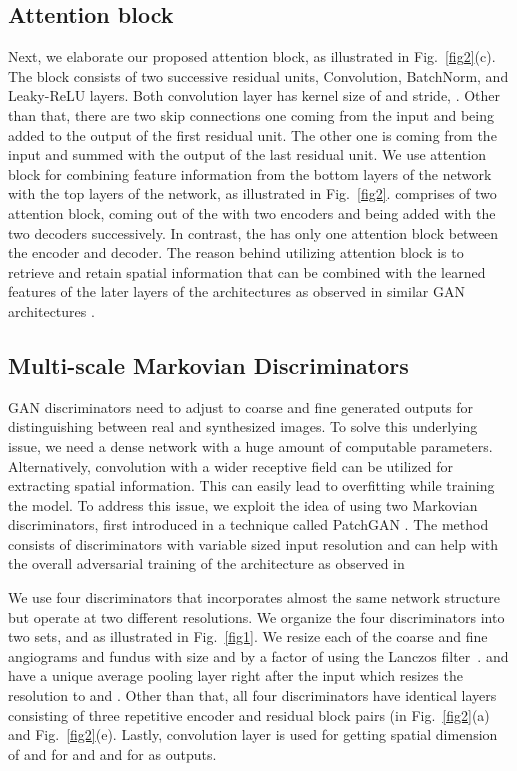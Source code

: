 \documentclass[a4paper,conference]{IEEEtran}
\begin{document}
\subsection{Attention block}
\label{subsec:attention}
Next, we elaborate our proposed attention block, as illustrated in
Fig.~\ref{fig2}(c). The block consists of two successive residual units, Convolution, BatchNorm, and Leaky-ReLU layers. Both convolution layer has kernel size of  and stride, . Other than that, there are two skip connections one coming from the input and being added to the output of the first residual unit. The other one is coming from the input and summed with the output of the last residual unit. We use attention block for combining feature information from the bottom layers of the network with the top layers of the network, as illustrated in Fig.~\ref{fig2}.  comprises of two attention block, coming out of the with two encoders and being added with the two decoders successively. In contrast, the  has only one attention block between the encoder and decoder.  The reason behind utilizing attention block is to retrieve and retain spatial information that can be combined with the learned features of the later layers of the architectures as observed in similar GAN architectures \cite{zhang2019self,chen2018attention}. 


\subsection{Multi-scale Markovian Discriminators}
\label{subsec:discriminators}
GAN discriminators need to adjust to coarse and fine generated outputs for distinguishing between real and synthesized images. To solve this underlying issue, we need a dense network with a huge amount of computable parameters. Alternatively, convolution with a wider receptive field can be utilized for extracting spatial information. This can easily lead to overfitting while training the model. To address this issue, we exploit the idea of using two Markovian discriminators, first introduced in a technique called PatchGAN \cite{li2016precomputed}. The method consists of discriminators with variable sized input resolution and can help with the overall adversarial training of the architecture as observed in \cite{wang2018high}

We use four discriminators that incorporates almost the same network structure but operate at two different resolutions. We organize the four discriminators into two sets,  and  as illustrated in Fig.~\ref{fig1}.  We resize each of the coarse and fine angiograms and fundus with size  and  by a factor of  using the Lanczos filter~\cite{duchon1979lanczos}.  and  have a unique average pooling layer right after the input which resizes the resolution to   and . Other than that, all four discriminators have identical layers consisting of three repetitive encoder and residual block pairs (in Fig.~\ref{fig2}(a) and Fig.~\ref{fig2}(e). Lastly, convolution layer is used for getting spatial dimension of  and   for  and  and  for   as outputs.
\end{document}

